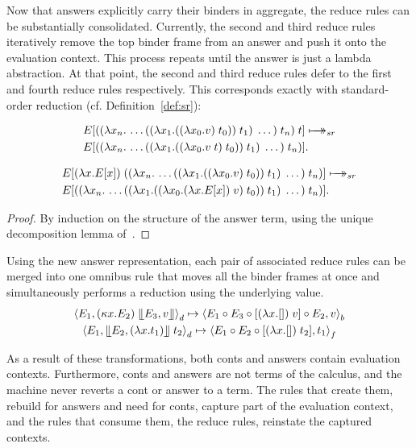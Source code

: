 \documentclass{LMCS}
\theoremstyle{plain}
\theoremstyle{remark}
\newcommand{\mapsTo}[0]{\mbox{\ensuremath{\makebox[0pt][l]{\hspace{7pt}$\rightarrow$}\longmapsto}}}
\newcommand{\Sr}[0]{\ensuremath{\mapsTo_{sr}}}
\renewcommand{\comp}[0]{\ensuremath{\circ}}
\newcommand{\answer}[1]{\llfloor#1\rrfloor}
\newcommand{\refocus}[1]{\Braket{#1}_f}
\newcommand{\rebuild}[1]{\Braket{#1}_b}
\newcommand{\reduce}[1]{\Braket{#1}_d}
\begin{document}
Now that answers explicitly carry their binders in aggregate, the reduce
rules can be substantially consolidated.  Currently, the second and third
reduce rules iteratively remove the top binder frame from an answer and
push it onto the evaluation context.  This process repeats until the answer
is just a lambda abstraction.  At that point, the second and third reduce
rules defer to the first and fourth reduce rules respectively. This
corresponds exactly with standard-order reduction 
(cf. Definition~\ref{def:sr}):
\begin{prop}
\label{prp:fast-sr}
\begin{equation*}
  \begin{split}
  & E[((\lambda x_n.\, \dots 
  ((\lambda x_1. ((\lambda x_0.v)\; t_0)) \;t_1) \;\dots)\;t_n) \; t] 
 \Sr \\
  & E[((\lambda x_n.\, \dots 
  ((\lambda x_1. ((\lambda x_0.v\; t)\; t_0)) \;t_1) \;\dots)\;t_n)].
  \end{split}
\end{equation*}

\begin{equation*}
  \begin{split}
    & E[(\lambda x.E[x])\;
    ((\lambda x_n.\, \dots 
    ((\lambda x_1. ((\lambda x_0.v)\; t_0)) \;t_1) \;\dots)\;t_n)]  \Sr  \\
    & E[((\lambda x_n.\, \dots ((\lambda x_1. ((\lambda x_0.
    (\lambda x.E[x])\; v)\; t_0)) \;t_1) \;\dots)\;t_n)].
  \end{split}
\end{equation*}
\end{prop}
\begin{proof}
  By induction on the structure of the answer term, using the
  unique decomposition lemma of~\citet{ariola97need}.
\end{proof}

Using the new answer representation, 
each pair of associated reduce rules can be merged into one omnibus rule
that moves all the binder frames at once and simultaneously performs a 
reduction using the underlying value. 
\begin{gather*}
  \reduce{E_1, (\kappa x.E_2)\; \answer{E_3, v}} \mapsto 
  \rebuild{E_1 \comp E_3 \comp [(\lambda x.[])\;v] \comp E_2, v} \\
  \reduce{E_1, \answer{E_2,(\lambda x.t_1)}\;t_2} \mapsto
  \refocus{E_1 \comp E_2 \comp [(\lambda x.[])\; t_2], t_1} 
\end{gather*}

As a result of these transformations, both conts and answers contain evaluation
contexts.  Furthermore, conts and answers are not terms of the calculus, and
the machine never reverts a cont or answer to a term.  The rules that create
them, rebuild for answers and need for conts, capture part of the evaluation
context, and the rules that consume them, the reduce rules, reinstate the
captured contexts.
\end{document}
